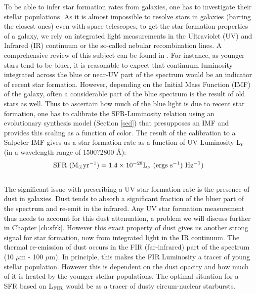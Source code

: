To be able to infer star formation rates from galaxies, one has to investigate their stellar populations. As it is almost impossible to resolve stars in galaxies (barring the closest ones) even with space telescopes, to get the star formation properties of a galaxy, we rely on integrated light measurements in the Ultraviolet (UV) and Infrared (IR) continuum or the so-called nebular recombination lines. A comprehensive review of this subject can be found in \citet{1998ARA&A..36..189K}. For instance, as younger stars tend to be bluer, it is reasonable to expect that continuum luminosity integrated across the blue or near-UV part of the spectrum would be an indicator of recent star formation. However, depending on the Initial Mass Function (IMF) of the galaxy, often a considerable part of the blue spectrum is the result of old stars as well. Thus to ascertain how much of the blue light is due to recent star formation, one has to calibrate the SFR-Luminosity relation using an evolutionary synthesis model (Section \ref{sed}) that presupposes an IMF and provides this scaling as a function of color. The result of the \citet{1998ApJ...498..106M} calibration to a Salpeter IMF \citep{1955ApJ...121..161S} gives us a star formation rate as a function of UV Luminosity ${\rm L}_{\nu}$(in a wavelength range of 1500?2800 \AA):
$${\rm SFR}\hbox{ }({\rm M}_{\odot} {\rm yr}^{-1}) = 1.4 \times 10^{-28} {\rm L}_{\nu} \hbox{ }({\rm ergs }\hbox{ } {\rm s}^{-1})\hbox{ } {\rm Hz}^{-1})$$\\

The significant issue with prescribing a UV star formation rate is the presence of dust in galaxies. Dust tends to absorb a significant fraction of the bluer part of the spectrum and re-emit in the infrared. Any UV star formation measurement thus needs to account for this dust attenuation, a problem we will discuss further in Chapter \ref{ch:sfrk}. However this exact property of dust gives us another strong signal for star formation, now from integrated light in the IR continuum. The thermal re-emission of dust occurs in the FIR (far-infrared) part of the spectrum (10 $\mu$m - 100 $\mu$m). In principle, this makes the FIR Luminosity a tracer of young stellar population. However this is dependent on the dust opacity and how much of it is heated by the younger stellar populations. The optimal situation for a SFR based on ${\rm L}_{\rm FIR}$ would be as a tracer of dusty circum-nuclear starbursts.\\

